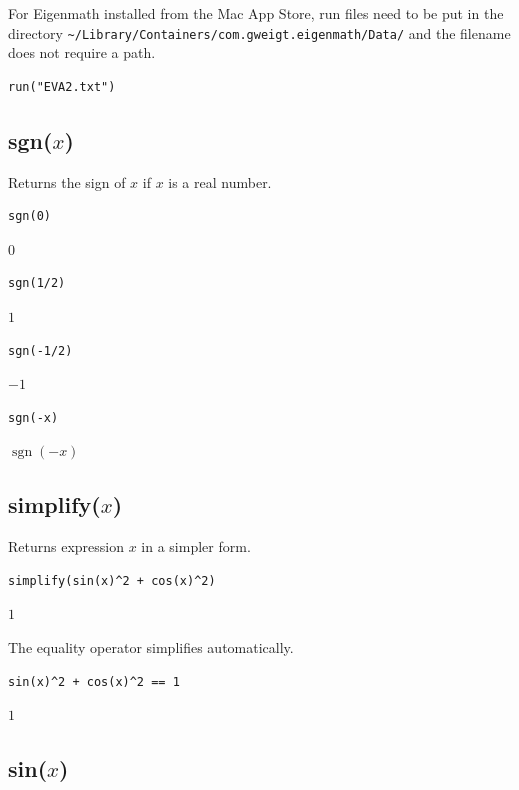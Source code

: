 For Eigenmath installed from the Mac App Store,
run files need to be put in the directory
\verb$~/Library/Containers/com.gweigt.eigenmath/Data/$
and the filename does not require a path.

{\color{blue}
\begin{verbatim}
run("EVA2.txt")
\end{verbatim}
}

\subsection*{sgn($x$)}

Returns the sign of $x$ if $x$ is a real number.

{\color{blue}
\begin{verbatim}
sgn(0)
\end{verbatim}
}

$0$

{\color{blue}
\begin{verbatim}
sgn(1/2)
\end{verbatim}
}

$1$

{\color{blue}
\begin{verbatim}
sgn(-1/2)
\end{verbatim}
}

$-1$

{\color{blue}
\begin{verbatim}
sgn(-x)
\end{verbatim}
}

$\operatorname{sgn}(-x)$

\subsection*{simplify($x$)}

Returns expression $x$ in a simpler form.

{\color{blue}
\begin{verbatim}
simplify(sin(x)^2 + cos(x)^2)
\end{verbatim}
}

$1$

\bigskip
The equality operator simplifies automatically.

{\color{blue}
\begin{verbatim}
sin(x)^2 + cos(x)^2 == 1
\end{verbatim}
}

$1$

\subsection*{sin($x$)}

